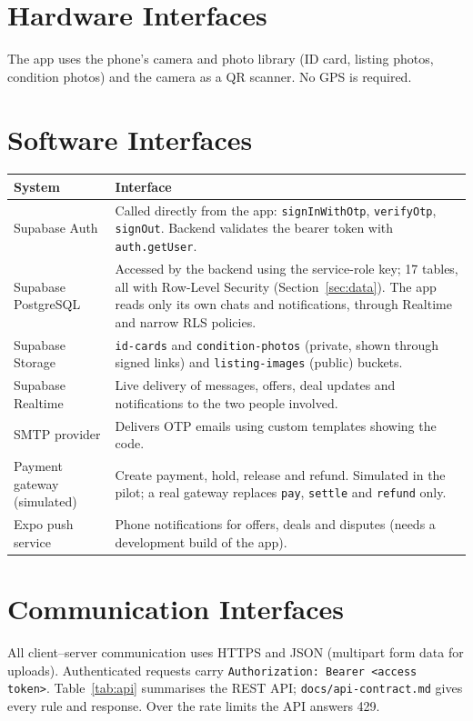 \documentclass[11pt,a4paper]{scrreprt}
\begin{document}
\section{Hardware Interfaces}
The app uses the phone's camera and photo library (ID card, listing
photos, condition photos) and the camera as a QR scanner. No GPS is required.

\section{Software Interfaces}
\begin{longtable}{L{3.6cm} L{11.6cm}}
\toprule
\textbf{System} & \textbf{Interface}\\ \midrule\endhead
Supabase Auth & Called directly from the app: \texttt{signInWithOtp}, \texttt{verifyOtp}, \texttt{signOut}. Backend validates the bearer token with \texttt{auth.getUser}.\\
Supabase PostgreSQL & Accessed by the backend using the service-role key; 17 tables, all with Row-Level Security (Section~\ref{sec:data}). The app reads only its own chats and notifications, through Realtime and narrow RLS policies.\\
Supabase Storage & \texttt{id-cards} and \texttt{condition-photos} (private, shown through signed links) and \texttt{listing-images} (public) buckets.\\
Supabase Realtime & Live delivery of messages, offers, deal updates and notifications to the two people involved.\\
SMTP provider & Delivers OTP emails using custom templates showing the code.\\
Payment gateway (simulated) & Create payment, hold, release and refund. Simulated in the pilot; a real gateway replaces \texttt{pay}, \texttt{settle} and \texttt{refund} only.\\
Expo push service & Phone notifications for offers, deals and disputes (needs a development build of the app).\\
\bottomrule
\end{longtable}

\section{Communication Interfaces}
All client--server communication uses HTTPS and JSON (multipart form data
for uploads). Authenticated requests carry
\texttt{Authorization: Bearer <access token>}. Table~\ref{tab:api}
summarises the REST API; \texttt{docs/api-contract.md} gives every rule and
response. Over the rate limits the API answers 429.
\end{document}
